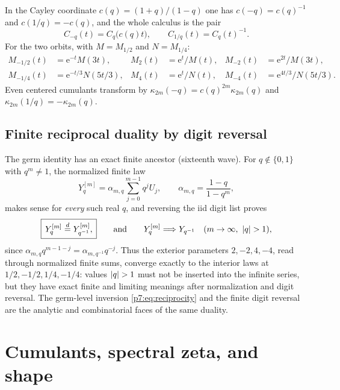 \documentclass[11pt,oneside]{article}
\numberwithin{equation}{section}
\theoremstyle{definition}
\theoremstyle{remark}
\newcommand{\e}{\mathrm e}
\begin{document}
In the Cayley coordinate $c(q)=(1+q)/(1-q)$ one has $c(-q)=c(q)^{-1}$ and
$c(1/q)=-c(q)$, and the whole calculus is the pair
\begin{equation}\label{p7:eq:cayley-calculus}
 C_{-q}(t)=C_q\bigl(c(q)t\bigr),
 \qquad
 C_{1/q}(t)=C_q(t)^{-1}.
\end{equation}
For the two orbits, with $M=M_{1/2}$ and $N=M_{1/4}$:
\begin{align}
 M_{-1/2}(t)&=\e^{-t}M(3t),
 &M_2(t)&=\e^t/M(t),
 &M_{-2}(t)&=\e^{2t}/M(3t),
 \label{p7:eq:dyadic-orbit}\\
 M_{-1/4}(t)&=\e^{-t/3}N(5t/3),
 &M_4(t)&=\e^t/N(t),
 &M_{-4}(t)&=\e^{4t/3}/N(5t/3).
 \label{p7:eq:quartic-orbit}
\end{align}
Even centered cumulants transform by
$\kappa_{2m}(-q)=c(q)^{2m}\kappa_{2m}(q)$ and
$\kappa_{2m}(1/q)=-\kappa_{2m}(q)$.

\subsection{Finite reciprocal duality by digit reversal}

The germ identity has an exact finite ancestor (sixteenth wave).  For
$q\notin\{0,1\}$ with $q^m\ne1$, the normalized finite law
\begin{equation}\label{p7:eq:finite-law}
 Y_q^{[m]}=\alpha_{m,q}\sum_{j=0}^{m-1}q^jU_j,
 \qquad
 \alpha_{m,q}=\frac{1-q}{1-q^m},
\end{equation}
makes sense for \emph{every} such real $q$, and reversing the iid digit list
proves
\begin{equation}\label{p7:eq:finite-reciprocal}
 \boxed{\,Y_q^{[m]}\overset d=Y_{q^{-1}}^{[m]},\,}
 \qquad\text{and}\qquad
 Y_q^{[m]}\Longrightarrow Y_{q^{-1}}
 \quad(m\to\infty,\ \left\lvert q\right\rvert>1),
\end{equation}
since $\alpha_{m,q}q^{m-1-j}=\alpha_{m,q^{-1}}q^{-j}$.  Thus the exterior
parameters $2,-2,4,-4$, read through normalized finite sums, converge exactly
to the interior laws at $1/2,-1/2,1/4,-1/4$: values $\left\lvert q\right\rvert>1$ must not be
inserted into the infinite series, but they have exact finite and limiting
meanings after normalization and digit reversal.  The germ-level inversion
\eqref{p7:eq:reciprocity} and the finite digit reversal are the analytic and
combinatorial faces of the same duality.
\section{Cumulants, spectral zeta, and shape}
\label{p7:sec:cumulants}
\end{document}
